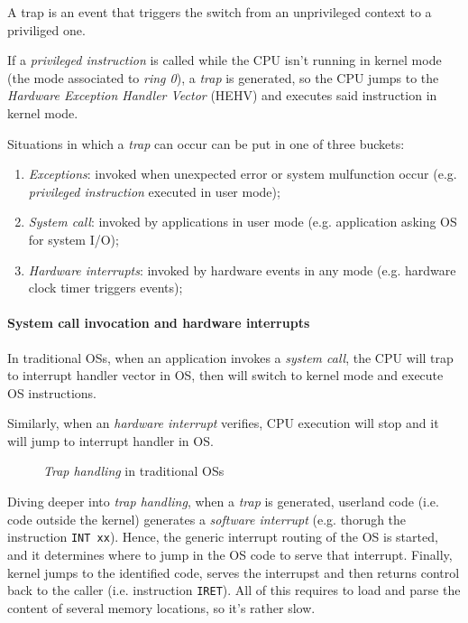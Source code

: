 \begin{definition}[Trap]
    A trap is an event that triggers the switch from an unprivileged context to
    a priviliged one.
\end{definition}\noindent
If a \emph{privileged instruction} is called while the CPU isn't running in
kernel mode (the mode associated to \emph{ring 0}), a \emph{trap} is generated,
so the CPU jumps to the \emph{Hardware Exception Handler Vector} (HEHV) and
executes said instruction in kernel mode.

Situations in which a \emph{trap} can occur can be put in one of three buckets:
\begin{enumerate}
    \item\emph{Exceptions}: invoked when unexpected error or system mulfunction
    occur (e.g. \emph{privileged instruction} executed in user mode);
    \item\emph{System call}: invoked by applications in user mode (e.g.
    application asking OS for system I/O);
    \item\emph{Hardware interrupts}: invoked by hardware events in any mode
    (e.g. hardware clock timer triggers events);
\end{enumerate}

\paragraph{System call invocation and hardware interrupts}
In traditional OSs, when an application invokes a \emph{system call}, the CPU
will trap to interrupt handler vector in OS, then will switch to kernel mode
and execute OS instructions.

Similarly, when an \emph{hardware interrupt} verifies, CPU execution will stop
and it will jump to interrupt handler in OS.

\begin{figure}[h!]
    \centering
    \caption{\emph{Trap handling} in traditional OSs}
\end{figure}

\noindent
Diving deeper into \emph{trap handling}, when a \emph{trap} is generated,
userland code (i.e. code outside the kernel) generates a \emph{software
interrupt} (e.g. thorugh the instruction \texttt{INT xx}). Hence, the generic
interrupt routing of the OS is started, and it determines where to jump in the
OS code to serve that interrupt. Finally, kernel jumps to the identified code,
serves the interrupst and then returns control back to the caller (i.e.
instruction \texttt{IRET}). All of this requires to load and parse the content
of several memory locations, so it's rather slow.

